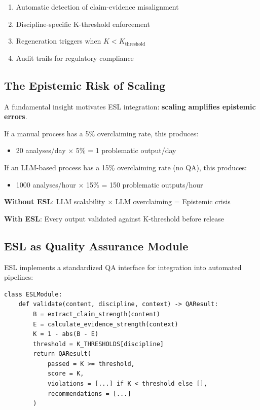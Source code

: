 \documentclass[11pt,a4paper]{article}
\begin{document}
\begin{enumerate}
    \item Automatic detection of claim-evidence misalignment
    \item Discipline-specific K-threshold enforcement
    \item Regeneration triggers when $K < K_{\text{threshold}}$
    \item Audit trails for regulatory compliance
\end{enumerate}

\subsection{The Epistemic Risk of Scaling}

A fundamental insight motivates ESL integration: \textbf{scaling amplifies
epistemic errors}.

If a manual process has a 5\% overclaiming rate, this produces:
\begin{itemize}
    \item 20 analyses/day $\times$ 5\% = 1 problematic output/day
\end{itemize}

If an LLM-based process has a 15\% overclaiming rate (no QA), this produces:
\begin{itemize}
    \item 1000 analyses/hour $\times$ 15\% = 150 problematic outputs/hour
\end{itemize}

\begin{tcolorbox}[colback=red!5!white, colframe=red!75!black, title=The Scaling Problem]
\textbf{Without ESL}: LLM scalability $\times$ LLM overclaiming = Epistemic crisis

\textbf{With ESL}: Every output validated against K-threshold before release
\end{tcolorbox}

\subsection{ESL as Quality Assurance Module}

ESL implements a standardized QA interface for integration into automated
pipelines:

\begin{verbatim}
class ESLModule:
    def validate(content, discipline, context) -> QAResult:
        B = extract_claim_strength(content)
        E = calculate_evidence_strength(context)
        K = 1 - abs(B - E)
        threshold = K_THRESHOLDS[discipline]
        return QAResult(
            passed = K >= threshold,
            score = K,
            violations = [...] if K < threshold else [],
            recommendations = [...]
        )
\end{verbatim}
\end{document}
